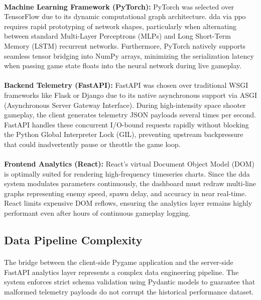 \paragraph{} \textbf{Machine Learning Framework (PyTorch):} PyTorch was selected over TensorFlow due to its dynamic computational graph architecture. \ac{dda} via \ac{ppo} requires rapid prototyping of network shapes, particularly when alternating between standard Multi-Layer Perceptrons (MLPs) and Long Short-Term Memory (LSTM) recurrent networks. Furthermore, PyTorch natively supports seamless tensor bridging into NumPy arrays, minimizing the serialization latency when passing game state floats into the neural network during live gameplay.
\paragraph{} \textbf{Backend Telemetry (FastAPI):} FastAPI was chosen over traditional WSGI frameworks like Flask or Django due to its native asynchronous support via ASGI (Asynchronous Server Gateway Interface). During high-intensity space shooter gameplay, the client generates telemetry JSON payloads several times per second. FastAPI handles these concurrent I/O-bound requests rapidly without blocking the Python Global Interpreter Lock (GIL), preventing upstream backpressure that could inadvertently pause or throttle the game loop.
\paragraph{} \textbf{Frontend Analytics (React):} React’s virtual Document Object Model (DOM) is optimally suited for rendering high-frequency timeseries charts. Since the \ac{dda} system modulates parameters continuously, the dashboard must redraw multi-line graphs representing enemy speed, spawn delay, and accuracy in near real-time. React limits expensive DOM reflows, ensuring the analytics layer remains highly performant even after hours of continuous gameplay logging.

\subsection{Data Pipeline Complexity}
\paragraph{} The bridge between the client-side Pygame application and the server-side FastAPI analytics layer represents a complex data engineering pipeline. The system enforces strict schema validation using Pydantic models to guarantee that malformed telemetry payloads do not corrupt the historical performance dataset. 
